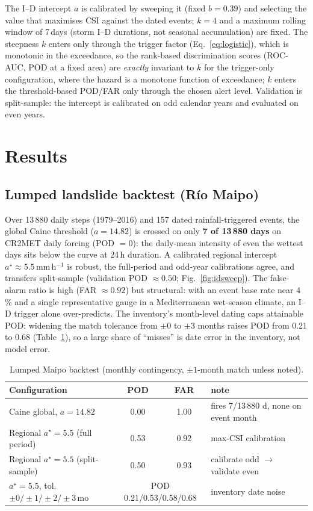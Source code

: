 \documentclass[authoryear,preprint,review,12pt]{elsarticle}
\begin{document}
The I--D intercept $a$ is calibrated by sweeping it (fixed $b=0.39$) and selecting
the value that maximises CSI against the dated events; $k=4$ and a maximum rolling
window of 7\,days (storm I--D durations, not seasonal accumulation) are fixed.
The steepness $k$ enters only through the trigger factor (Eq.~\ref{eq:logistic}),
which is monotonic in the exceedance, so the rank-based discrimination scores
(ROC-AUC, POD at a fixed area) are \emph{exactly} invariant to $k$ for the
trigger-only configuration, where the hazard is a monotone function of exceedance;
$k$ enters the threshold-based POD/FAR only through the chosen alert level.
Validation is split-sample: the intercept is calibrated on odd calendar years and
evaluated on even years.

\section{Results}

\subsection{Lumped landslide backtest (R\'io Maipo)}
\label{sec:lumped}

Over 13\,880 daily steps (1979--2016) and 157 dated rainfall-triggered events, the
global Caine threshold ($a=14.82$) is crossed on only \textbf{7 of 13\,880 days} on CR2MET daily forcing
(POD $=0$): the daily-mean intensity of even the wettest days sits below the curve
at 24\,h duration. A calibrated regional intercept $a^\star\approx5.5$\,mm\,h$^{-1}$
is robust, the full-period and odd-year calibrations agree, and transfers
split-sample (validation POD $\approx 0.50$; Fig.~\ref{fig:idsweep}). The
false-alarm ratio is high (FAR $\approx 0.92$) but structural: with an event base rate near 4\,\% and a
single representative gauge in a Mediterranean wet-season climate, an I--D trigger
alone over-predicts. The inventory's month-level dating caps attainable POD:
widening the match tolerance from $\pm0$ to $\pm3$ months raises POD from 0.21 to
0.68 (Table~\ref{tab:lumped}), so a large share of ``misses'' is date error in the
inventory, not model error.

\begin{table}[ht]
\centering
\caption{Lumped Maipo backtest (monthly contingency, $\pm1$-month match unless noted).}
\label{tab:lumped}
\begin{tabular}{@{}lccl@{}}
\toprule
Configuration & POD & FAR & note \\
\midrule
Caine global, $a=14.82$ & 0.00 & 1.00 & fires 7/13\,880 d, none on event month \\
Regional $a^\star=5.5$ (full period) & 0.53 & 0.92 & max-CSI calibration \\
Regional $a^\star=5.5$ (split-sample) & 0.50 & 0.93 & calibrate odd $\to$ validate even \\
$a^\star=5.5$, tol. $\pm0/\pm1/\pm2/\pm3$\,mo & \multicolumn{2}{c}{POD 0.21/0.53/0.58/0.68} & inventory date noise \\
\bottomrule
\end{tabular}
\end{table}
\end{document}
